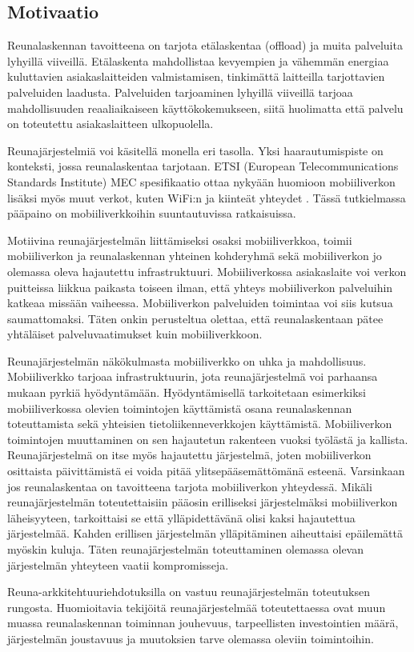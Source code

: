 \subsection{Motivaatio}
Reunalaskennan tavoitteena on tarjota etälaskentaa (offload) ja muita palveluita lyhyillä viiveillä. 
Etälaskenta mahdollistaa kevyempien ja vähemmän energiaa kuluttavien asiakaslaitteiden valmistamisen, tinkimättä laitteilla tarjottavien palveluiden laadusta.
Palveluiden tarjoaminen lyhyillä viiveillä tarjoaa mahdollisuuden reaaliaikaiseen käyttökokemukseen, siitä huolimatta että palvelu on toteutettu asiakaslaitteen ulkopuolella. 

Reunajärjestelmiä voi käsitellä monella eri tasolla. Yksi haarautumispiste on  konteksti, jossa reunalaskentaa tarjotaan. ETSI (European Telecommunications Standards Institute) MEC spesifikaatio ottaa nykyään huomioon mobiiliverkon lisäksi myös muut verkot, kuten WiFi:n ja kiinteät yhteydet \cite{taleb2017multi}. Tässä tutkielmassa pääpaino on mobiiliverkkoihin suuntautuvissa ratkaisuissa.

Motiivina reunajärjestelmän liittämiseksi osaksi mobiiliverkkoa, toimii mobiiliverkon ja reunalaskennan yhteinen kohderyhmä sekä mobiiliverkon jo olemassa oleva hajautettu infrastruktuuri.
Mobiiliverkossa asiakaslaite voi verkon puitteissa liikkua paikasta toiseen ilman, että yhteys mobiiliverkon palveluihin katkeaa missään vaiheessa. Mobiiliverkon palveluiden toimintaa voi siis kutsua saumattomaksi. 
Täten onkin perusteltua olettaa, että reunalaskentaan pätee yhtäläiset palveluvaatimukset kuin mobiiliverkkoon.

Reunajärjestelmän näkökulmasta mobiiliverkko on uhka ja mahdollisuus. Mobiiliverkko tarjoaa infrastruktuurin, jota reunajärjestelmä voi parhaansa mukaan pyrkiä hyödyntämään.
Hyödyntämisellä tarkoitetaan esimerkiksi mobiiliverkossa olevien toimintojen käyttämistä osana reunalaskennan toteuttamista sekä yhteisien tietoliikenneverkkojen käyttämistä.
Mobiiliverkon toimintojen muuttaminen on sen hajautetun rakenteen vuoksi työlästä ja kallista. 
Reunajärjestelmä on itse myös hajautettu järjestelmä, joten mobiiliverkon osittaista päivittämistä ei voida pitää ylitsepääsemättömänä esteenä. Varsinkaan jos reunalaskentaa on tavoitteena tarjota mobiiliverkon yhteydessä. 
Mikäli reunajärjestelmän toteutettaisiin pääosin erilliseksi järjestelmäksi mobiiliverkon läheisyyteen, tarkoittaisi se että ylläpidettävänä olisi kaksi hajautettua järjestelmää. 
Kahden erillisen järjestelmän ylläpitäminen aiheuttaisi epäilemättä myöskin kuluja.
Täten reunajärjestelmän toteuttaminen olemassa olevan järjestelmän yhteyteen vaatii kompromisseja.


Reuna-arkkitehtuuriehdotuksilla on vastuu reunajärjestelmän toteutuksen rungosta.
Huomioitavia tekijöitä reunajärjestelmää toteutettaessa ovat muun muassa reunalaskennan toiminnan jouhevuus, tarpeellisten investointien määrä, järjestelmän joustavuus ja muutoksien tarve olemassa oleviin toimintoihin.
